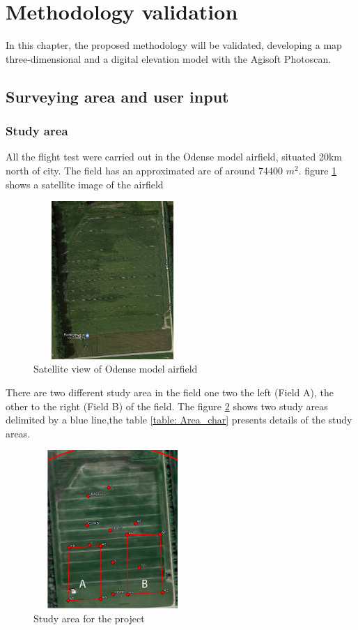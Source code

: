\section{Methodology validation}
In this chapter, the proposed methodology will be validated, developing a map three-dimensional and a digital elevation model with the Agisoft Photoscan.
\subsection{Surveying area and user input}
\subsubsection{Study area}

All the flight test were carried out in the Odense model airfield, situated 20km north of city. The field has an approximated are of around 74400 $m^2$. figure \ref{fig:Airfield} shows a satellite image of the airfield
\begin{figure}[H]
\centering
\includegraphics[width=6cm,height=6cm,keepaspectratio]{imagenes/Satellite.png}
\caption{Satellite view of Odense model airfield}
\label{fig:Airfield}
\end{figure}

There are two different study area in the field one two the left (Field A), the other to the right (Field B) of the field. The figure \ref{fig:Study area} shows two study areas delimited by a blue line,the table \ref{table: Area_char} presents details of the study areas.
\begin{figure}[H]
\centering
\includegraphics[width=6cm,height=6cm,keepaspectratio]{imagenes/Study_Area.png}
\caption{Study area for the project}
\label{fig:Study area}
\end{figure}

